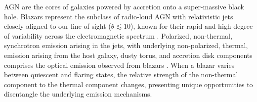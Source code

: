 



\gls{AGN} are the cores of galaxies powered by accretion onto a super-massive black hole.
Blazars represent the subclass of radio-loud \gls{AGN} with relativistic jets closely aligned to our line of sight ($\theta \lesssim 10$\degree), known for their rapid and high degree of variability across the electromagnetic spectrum \citep{Urry_1995}.
Polarized, non-thermal, synchrotron emission arising in the jets, with underlying non-polarized, thermal, emission arising from the host galaxy, dusty torus, and accretion disk components comprises the optical emission observed from blazars \citep{Ghisellini_2009}.
When a blazar varies between quiescent and flaring states, the relative strength of the non-thermal component to the thermal component changes, presenting unique opportunities to disentangle the underlying emission mechanisms.


